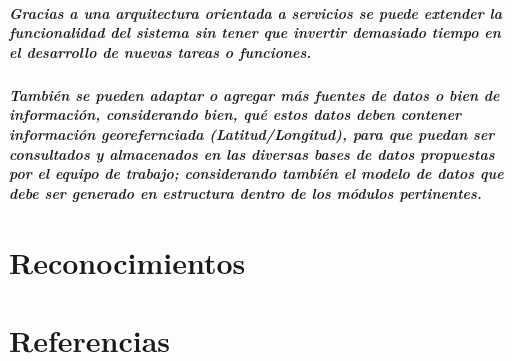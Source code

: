 \documentclass[12pt]{report}
\begin{document}
  \paragraph{Gracias a una arquitectura orientada a servicios se puede extender la funcionalidad del sistema sin tener que invertir demasiado tiempo en el desarrollo de nuevas tareas o funciones.}
  \paragraph{También se pueden adaptar o agregar más fuentes de datos o bien de información, considerando bien, qué estos datos deben contener información georefernciada (Latitud/Longitud), para que puedan ser consultados y almacenados en las diversas bases de datos propuestas por el equipo de trabajo; considerando también el modelo de datos que debe ser generado en estructura dentro de los módulos pertinentes.}

\chapter{Reconocimientos}
  \paragraph{}

\chapter{Referencias}
\end{document}
